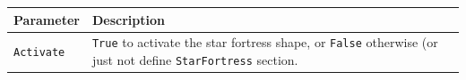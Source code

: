 \documentclass[tog]{acmsiggraph}
\begin{document}
\begin{tabularx}{0.48\textwidth}{ |l|X| }
\hline 
\textbf{Parameter} & \textbf{Description} \\[0.15cm]
 \hline
  \texttt{Activate} & \texttt{True} to activate the star fortress shape, or \texttt{False} otherwise (or just not define \texttt{StarFortress} section. \\
  \hline
\end{tabularx} 
\end{document}
